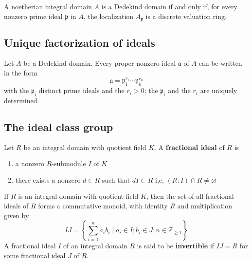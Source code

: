 \begin{proposition}
    A noetherian integral domain $A$ is a Dedekind domain if and only if, for every nonzero prime ideal $\mathfrak{p}$ in $A$, the localization $A_{\mathfrak{p}}$ is a discrete valuation ring.
\end{proposition}



\subsection{Unique factorization of ideals} %
\begin{theorem}
    Let $A$ be a Dedekind domain.
    Every proper nonzero ideal $\mathfrak{a}$ of $A$ can be written in the form
    \begin{equation*}
        \mathfrak{a}
        =
        \mathfrak{p}_1^{r_1} \cdots \mathfrak{p}_n^{r_n}
    \end{equation*}
    with the $\mathfrak{p}_i$ distinct prime ideals and the $r_i>0$; the $\mathfrak{p}_i$ and the $r_i$ are uniquely determined.
\end{theorem}

\subsection{The ideal class group} %
\begin{definition}
    Let $R$ be an integral domain with quotient field $K$.
    A \textbf{fractional ideal} of $R$ is
    \begin{enumerate}[label=(\roman*)]
        \item a nonzero $R$-submodule $I$ of $K$
        \item there exists a nonzero $d \in R$ such that $d I \subset R$ i,e, $\left(R:I\right)\cap R \neq \varnothing$
    \end{enumerate}
\end{definition}




\begin{definition}
    If $R$ is an integral domain with quotient field $K$, then the set of all
    fractional ideals of $R$ forms a commutative monoid, with identity $R$ and multiplication given by
    \begin{equation*}
        I J
        =
        \left\{\sum_{i=1}^n a_i b_i \mid a_i \in I ; b_i \in J ; n \in \mathbb{Z}_{\geq 1}\right\}
    \end{equation*}
    A fractional ideal $I$ of an integral domain $R$ is said to be \textbf{invertible} if $I J=R$ for some fractional ideal $J$ of $R$.
\end{definition}


